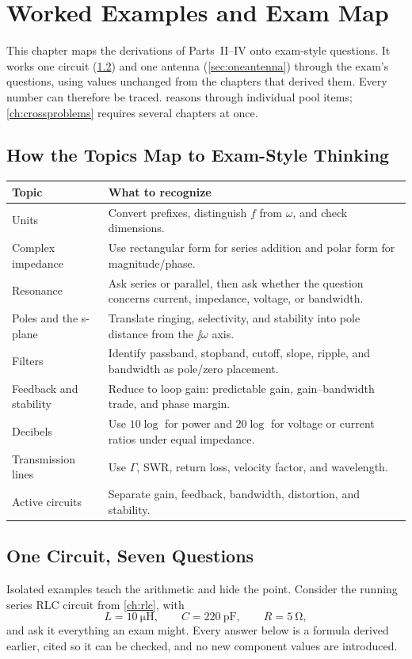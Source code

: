 \chapter{Worked Examples and Exam Map}
\label{ch:exammap}
This chapter maps the derivations of Parts~II--IV onto exam-style questions. It
works one circuit (\cref{sec:onecircuit}) and one antenna (\cref{sec:oneantenna})
through the exam's questions, using values unchanged from the chapters that derived
them. Every number can therefore be traced.  reasons through
individual pool items; \cref{ch:crossproblems} requires several chapters at once.

\section{How the Topics Map to Exam-Style Thinking}
\begin{tabularx}{\textwidth}{@{}L{0.24\textwidth}Y@{}}
\toprule
Topic & What to recognize \\
\midrule
Units & Convert prefixes, distinguish \(f\) from \(\omega\), and check dimensions. \\
Complex impedance & Use rectangular form for series addition and polar form for magnitude/phase. \\
Resonance & Ask series or parallel, then ask whether the question concerns current, impedance, voltage, or bandwidth. \\
Poles and the s-plane & Translate ringing, selectivity, and stability into pole distance from the \(\jj\omega\) axis. \\
Filters & Identify passband, stopband, cutoff, slope, ripple, and bandwidth as pole/zero placement. \\
Feedback and stability & Reduce to loop gain: predictable gain, gain--bandwidth trade, and phase margin. \\
Decibels & Use \(10\log\) for power and \(20\log\) for voltage or current ratios under equal impedance. \\
Transmission lines & Use \(\Gamma\), SWR, return loss, velocity factor, and wavelength. \\
Active circuits & Separate gain, feedback, bandwidth, distortion, and stability. \\
\bottomrule
\end{tabularx}

\section{One Circuit, Seven Questions}
\label{sec:onecircuit}
Isolated examples teach the arithmetic and hide the point. Consider the running
series RLC circuit from \cref{ch:rlc}, with
\[
L=\SI{10}{\micro\henry},
\qquad
C=\SI{220}{\pico\farad},
\qquad
R=\SI{5}{\ohm},
\]
and ask it everything an exam might. Every answer below is a formula derived earlier,
cited so it can be checked, and no new component values are introduced.

